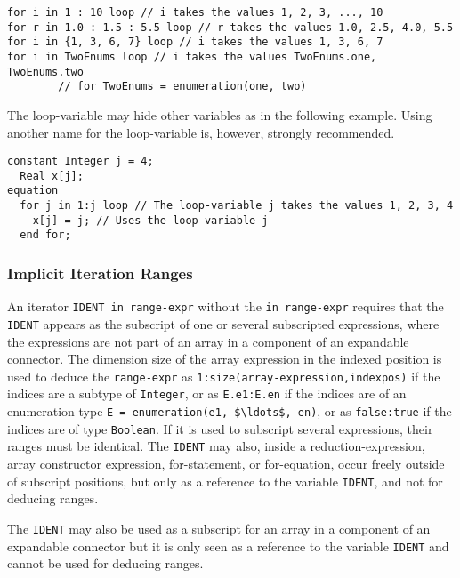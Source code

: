 \begin{example}
\begin{lstlisting}[language=modelica]
for i in 1 : 10 loop // i takes the values 1, 2, 3, ..., 10
for r in 1.0 : 1.5 : 5.5 loop // r takes the values 1.0, 2.5, 4.0, 5.5
for i in {1, 3, 6, 7} loop // i takes the values 1, 3, 6, 7
for i in TwoEnums loop // i takes the values TwoEnums.one, TwoEnums.two
        // for TwoEnums = enumeration(one, two)
\end{lstlisting}
The loop-variable may hide other variables as in the following example.  Using another name for the loop-variable is, however, strongly recommended.
\begin{lstlisting}[language=modelica]
  constant Integer j = 4;
  Real x[j];
equation
  for j in 1:j loop // The loop-variable j takes the values 1, 2, 3, 4
    x[j] = j; // Uses the loop-variable j
  end for;
\end{lstlisting}
\end{example}

\subsubsection{Implicit Iteration Ranges}\label{implicit-iteration-ranges}

An iterator \lstinline!IDENT in range-expr! without the \lstinline!in range-expr! requires that the \lstinline!IDENT! appears as the subscript of one or several subscripted expressions, where the expressions are not part of an array in a component of an expandable connector.  The dimension size of the array expression in the indexed position is used to deduce the \lstinline!range-expr! as \lstinline!1:size(array-expression,indexpos)! if the indices are a subtype of \lstinline!Integer!, or as \lstinline!E.e1:E.en! if the indices are of an enumeration type \lstinline!E = enumeration(e1, $\ldots$, en)!, or as \lstinline!false:true! if the indices are of type \lstinline!Boolean!.  If it is used to subscript several expressions, their ranges must be identical.  The \lstinline!IDENT! may also, inside a reduction-expression, array constructor expression, for-statement, or for-equation, occur freely outside of subscript positions, but only as a reference to the variable \lstinline!IDENT!, and not for deducing ranges.

The \lstinline!IDENT! may also be used as a subscript for an array in a component of an expandable connector
but it is only seen as a reference to the variable \lstinline!IDENT! and cannot be used for deducing ranges.

